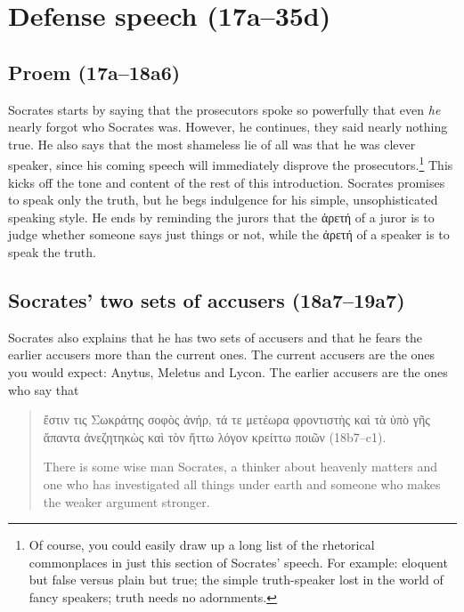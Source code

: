 \documentclass[11pt]{article}
\begin{document}

\section{Defense speech (17a--35d)}

\subsection{Proem (17a--18a6)}

Socrates starts by saying that the prosecutors spoke so powerfully that even \emph{he} nearly forgot who Socrates was.  However, he continues, they said nearly nothing true.   He also says that the most shameless lie of all was that he was clever speaker, since his coming speech will immediately disprove the prosecutors.\footnote{Of course, you could easily draw up a long list of the rhetorical commonplaces in just this section of Socrates' speech.  For example: eloquent but false versus plain but true; the simple truth-speaker lost in the world of fancy speakers; truth needs no adornments.}  This kicks off the tone and content of the rest of this introduction.  Socrates promises to speak only the truth, but he begs indulgence for his simple, unsophisticated speaking style.  He ends by reminding the jurors that the {\g ἀρετή} of a juror is to judge whether someone says just things or not, while the {\g ἀρετή} of a speaker is to speak the truth.


\subsection{Socrates' two sets of accusers (18a7--19a7)}

Socrates also explains that he has two sets of accusers and that he fears the earlier accusers more than the current ones.  The current accusers are the ones you would expect: Anytus, Meletus and Lycon.  The earlier accusers are the ones who say that

\begin{quote}
    {\g ἔστιν τις Σωκράτης σοφὸς ἀνήρ, τά τε μετέωρα φροντιστὴς καὶ τὰ ὑπὸ γῆς ἅπαντα ἀνεζητηκὼς καὶ τὸν ἥττω λόγον κρείττω ποιῶν} (18b7--c1).

    There is some wise man Socrates, a thinker about heavenly matters and one who has investigated all things under earth and someone who makes the weaker argument stronger.
\end{quote}
\end{document}
